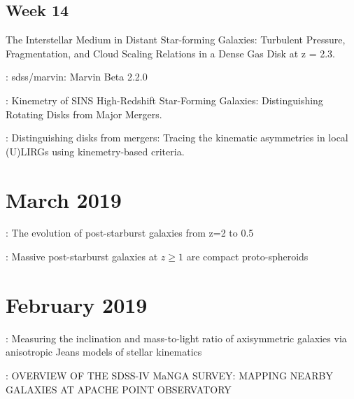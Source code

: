 \documentclass[ceqn,usenatbib,onecolumn]{mnras}
\begin{document}
\subsection{Week 14}
\par \citet{2011ApJ...742...11S} The Interstellar Medium in Distant Star-forming Galaxies: Turbulent Pressure, Fragmentation, and Cloud Scaling Relations in a Dense Gas Disk at z = 2.3.
\par \citet{brian_cherinka_2018_1146705} : sdss/marvin: Marvin Beta 2.2.0
\par \citet{2008ApJ...682..231S} : {Kinemetry of SINS High-Redshift Star-Forming Galaxies: Distinguishing Rotating Disks from Major Mergers}.
\par \citet{2016A&A...591A..85B} : {Distinguishing disks from mergers: Tracing the kinematic asymmetries in local (U)LIRGs using kinemetry-based criteria}.

\section{March 2019}
\citet{2016MNRAS.463..832W} : The evolution of post-starburst galaxies from z=2 to 0.5
\par \citet{2017MNRAS.472.1401A} : Massive post-starburst galaxies at $z \ge 1$ are compact proto-spheroids

\section{February 2019}
\citet{Cappellari2008} : {Measuring the inclination and mass-to-light ratio of
        axisymmetric galaxies via anisotropic Jeans models of stellar
        kinematics}
\par \citet{Bundy_2014} : {{OVERVIEW} {OF} {THE} {SDSS}-{IV} {MaNGA} {SURVEY}: {MAPPING} {NEARBY} {GALAXIES} {AT} {APACHE} {POINT} {OBSERVATORY}}



 
\end{document}

